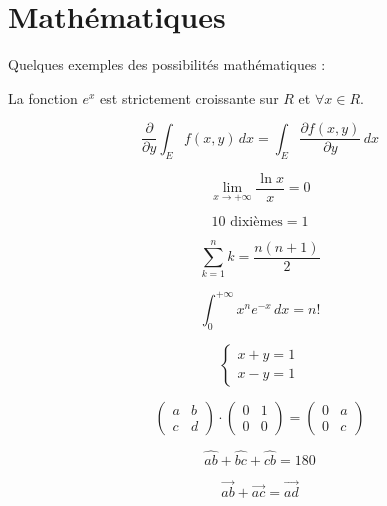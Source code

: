 \section{Mathématiques}
Quelques exemples des possibilités mathématiques :

La fonction $e^x$ est strictement croissante sur $R$ et $\forall x \in R$.

\begin{equation}
\frac{\partial}{\partial y}\int_E f(x,y)\,dx = \int_E \frac{\partial f(x,y)}{\partial y}\,dx
\end{equation}

$$\lim_{x \to +\infty} \frac{\ln x}{x} = 0$$

$$ 10 \textrm{ dixièmes} = 1 $$

\begin{equation}
\sum_{k=1}^n k = \frac{n(n+1)}{2}
\end{equation}

\begin{equation}
\int_0^{+\infty} x^n e^{-x}\,dx = n!
\end{equation}

$$\left \{\begin{array}{c}x+y=1\\x-y=1\end{array}\right.$$

\begin{equation}
\left( \begin{array}{cc} a & b \\ c & d \end{array} \right) \cdot
\left( \begin{array}{cc} 0 & 1 \\ 0 & 0 \end{array} \right) =
\left( \begin{array}{cc} 0 & a \\ 0 & c \end{array} \right)
\end{equation}

$$\widehat{ab} + \widehat{bc} + \widehat{cb} = 180$$

$$\overrightarrow{ab} + \overrightarrow{ac} = \overrightarrow{ad}$$
